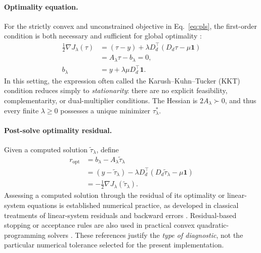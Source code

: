 \paragraph{Optimality equation.}
For the strictly convex and unconstrained objective in
Eq.~\eqref{eq:pls}, the first-order condition is both necessary and
sufficient for global optimality \citep{boyd2004convex}:
\begin{equation}\label{eq:kktderiv}
\begin{split}
\frac12\nabla J_\lambda(\tau)
&=(\tau-y)+\lambda D_d^\top(D_d\tau-\mu\mathbf{1})\\
&=A_\lambda\tau-b_\lambda=0,\\
b_\lambda&=y+\lambda\mu D_d^\top\mathbf1.
\end{split}
\end{equation}
In this setting, the expression often called the
Karush--Kuhn--Tucker (KKT) condition reduces simply to
\emph{stationarity}: there are no explicit feasibility,
complementarity, or dual-multiplier conditions. The Hessian is
$2A_\lambda\succ0$, and thus every finite $\lambda\geq0$
possesses a unique minimizer $\tau_\lambda^*$.

\paragraph{Post-solve optimality residual.}
Given a computed solution $\widetilde\tau_\lambda$, define
\begin{equation}\label{eq:residualdef}
\begin{split}
r_{\mathrm{opt}}
&=b_\lambda-A_\lambda\widetilde\tau_\lambda\\
&=(y-\widetilde\tau_\lambda)
-\lambda D_d^\top(D_d\widetilde\tau_\lambda-\mu\mathbf1)\\
&=-\tfrac12\nabla J_\lambda(\widetilde\tau_\lambda).
\end{split}
\end{equation}
Assessing a computed solution through the residual of its
optimality or linear-system equations is established numerical
practice, as developed in classical treatments of linear-system
residuals and backward errors \citep{higham2002accuracy,golub2013matrix}. Residual-based
stopping or acceptance rules are also used in practical
convex quadratic-programming solvers
\citep{stellato2020osqp}. These references justify the
\emph{type of diagnostic}, not the particular numerical
tolerance selected for the present implementation.

